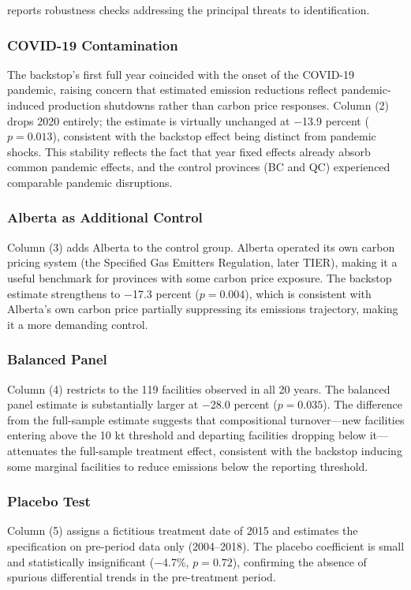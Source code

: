 \documentclass[12pt]{article}
\begin{document}


 reports robustness checks addressing the principal threats to identification.

\subsubsection*{COVID-19 Contamination} The backstop's first full year coincided with the onset of the COVID-19 pandemic, raising concern that estimated emission reductions reflect pandemic-induced production shutdowns rather than carbon price responses. Column (2) drops 2020 entirely; the estimate is virtually unchanged at $-$13.9 percent ($p = 0.013$), consistent with the backstop effect being distinct from pandemic shocks. This stability reflects the fact that year fixed effects already absorb common pandemic effects, and the control provinces (BC and QC) experienced comparable pandemic disruptions.

\subsubsection*{Alberta as Additional Control} Column (3) adds Alberta to the control group. Alberta operated its own carbon pricing system (the Specified Gas Emitters Regulation, later TIER), making it a useful benchmark for provinces with some carbon price exposure. The backstop estimate strengthens to $-$17.3 percent ($p = 0.004$), which is consistent with Alberta's own carbon price partially suppressing its emissions trajectory, making it a more demanding control.

\subsubsection*{Balanced Panel} Column (4) restricts to the 119 facilities observed in all 20 years. The balanced panel estimate is substantially larger at $-$28.0 percent ($p = 0.035$). The difference from the full-sample estimate suggests that compositional turnover---new facilities entering above the 10 kt threshold and departing facilities dropping below it---attenuates the full-sample treatment effect, consistent with the backstop inducing some marginal facilities to reduce emissions below the reporting threshold.

\subsubsection*{Placebo Test} Column (5) assigns a fictitious treatment date of 2015 and estimates the specification on pre-period data only (2004--2018). The placebo coefficient is small and statistically insignificant ($-$4.7\%, $p = 0.72$), confirming the absence of spurious differential trends in the pre-treatment period.
\end{document}
